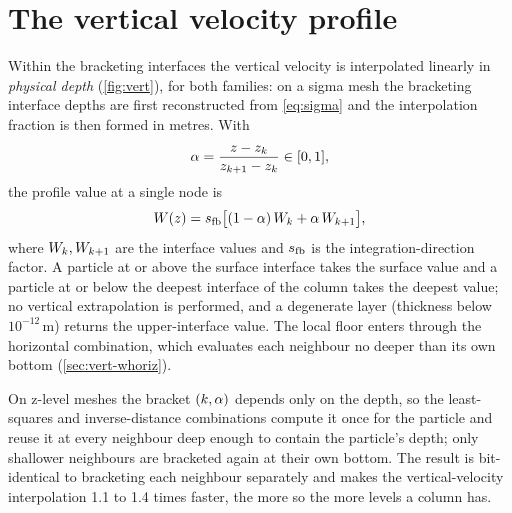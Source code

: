 \section{The vertical velocity profile}\label{sec:vert-wprofile}

Within the bracketing interfaces the vertical velocity is interpolated linearly in \emph{physical
depth} (\cref{fig:vert}), for both families: on a sigma mesh the bracketing interface depths are first
reconstructed from \cref{eq:sigma} and the interpolation fraction is then formed in metres. With
\begin{equation}\label{eq:vert-alpha}
  \alpha = \frac{z-z_k}{z_{k+1}-z_k}\in[0,1],
\end{equation}
the profile value at a single node is
\begin{equation}\label{eq:vert-wlin}
  W(z) = s_{\mathrm{fb}}\bigl[(1-\alpha)\,W_k + \alpha\,W_{k+1}\bigr],
\end{equation}
where $W_k,W_{k+1}$ are the interface values and $s_{\mathrm{fb}}$ is the integration-direction factor. A
particle at or above the surface interface takes the surface value and a particle at or below the
deepest interface of the column takes the deepest value; no vertical extrapolation is performed, and a
degenerate layer (thickness below $10^{-12}$\,m) returns the upper-interface value. The local floor
enters through the horizontal combination, which evaluates each neighbour no deeper than its own
bottom (\cref{sec:vert-whoriz}).

On z-level meshes the bracket $(k,\alpha)$ depends only on the depth, so the least-squares and
inverse-distance combinations compute it once for the particle and reuse it at every neighbour deep
enough to contain the particle's depth; only shallower neighbours are bracketed again at their own
bottom. The result is bit-identical to bracketing each neighbour separately and makes the vertical-velocity
interpolation 1.1 to 1.4 times faster, the more so the more levels a column has.

